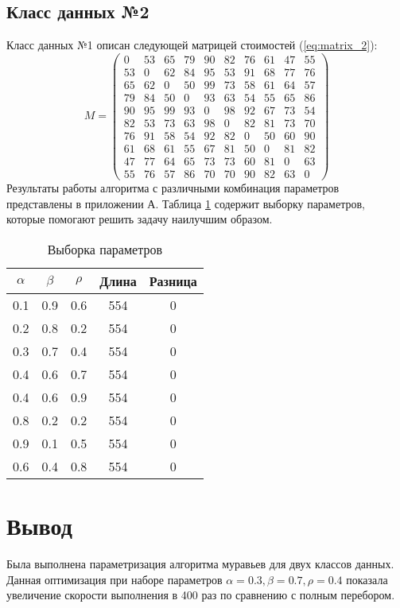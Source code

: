 \subsection{Класс данных №2}
Класс данных №1 описан следующей матрицей стоимостей (\ref{eq:matrix_2}):
\begin{equation}
	\label{eq:matrix_2}
	M = \begin{pmatrix}
		0  & 53 & 65 & 79 & 90 & 82 & 76 & 61 & 47 & 55 \\ 
		53 & 0  & 62 & 84 & 95 & 53 & 91 & 68 & 77 & 76 \\
		65 & 62 & 0  & 50 & 99 & 73 & 58 & 61 & 64 & 57 \\
		79 & 84 & 50 &  0 & 93 & 63 & 54 & 55 & 65 & 86 \\
		90 & 95 & 99 & 93 &  0 & 98 & 92 & 67 & 73 & 54 \\
		82 & 53 & 73 & 63 & 98 &  0 & 82 & 81 & 73 & 70 \\
		76 & 91 & 58 & 54 & 92 & 82 &  0 & 50 & 60 & 90 \\
		61 & 68 & 61 & 55 & 67 & 81 & 50 &  0 & 81 & 82 \\
		47 & 77 & 64 & 65 & 73 & 73 & 60 & 81 &  0 & 63 \\
		55 & 76 & 57 & 86 & 70 & 70 & 90 & 82 & 63 &  0
	\end{pmatrix}
\end{equation}
Результаты работы алгоритма с различными комбинация параметров представлены в приложении А. Таблица \ref{table:result_2} содержит выборку параметров, которые помогают решить задачу наилучшим образом.
\begin{table}[ht!]
	\centering
	\captionsetup{singlelinecheck = false, justification=raggedright}
	\caption{Выборка параметров}
	\label{table:result_2}
	\begin{tabular}{|c|c|c|c|c|}
		\hline	
		$\alpha$        & $\beta$      & $\rho$     &Длина  & Разница \\
		\hline
		0.1  & 0.9  & 0.6  & 554    & 0     \\
		0.2  & 0.8  & 0.2  & 554    & 0     \\
		0.3  & 0.7  & 0.4  & 554    & 0     \\
		0.4  & 0.6  & 0.7  & 554    & 0     \\
		0.4  & 0.6  & 0.9  & 554    & 0     \\
		0.8  & 0.2  & 0.2  & 554    & 0    \\
		0.9  & 0.1  & 0.5  & 554    & 0     \\
		0.6  & 0.4  & 0.8  & 554    & 0     \\
		\hline
	\end{tabular}
\end{table}

\section{Вывод}
Была выполнена параметризация алгоритма муравьев для двух классов данных. Данная оптимизация при наборе параметров $\alpha = 0.3, \beta = 0.7, \rho = 0.4$ показала увеличение скорости выполнения в 400 раз по сравнению с полным перебором.